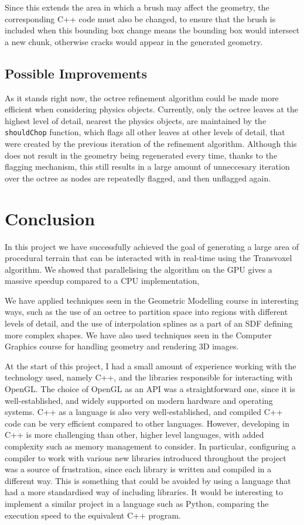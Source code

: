 \documentclass{article}
\begin{document}
Since this extends the area in which a brush may affect the geometry, the corresponding C++ code must also be changed, to ensure that the brush is included when this bounding box change means the bounding box would intersect a new chunk, otherwise cracks would appear in the generated geometry.

\subsection{Possible Improvements}
As it stands right now, the octree refinement algorithm could be made more efficient when considering physics objects. Currently, only the octree leaves at the highest level of detail, nearest the physics objects, are maintained by the \texttt{shouldChop} function, which flags all other leaves at other levels of detail, that were created by the previous iteration of the refinement algorithm. Although this does not result in the geometry being regenerated every time, thanks to the flagging mechanism, this still results in a large amount of unneccesary iteration over the octree as nodes are repeatedly flagged, and then unflagged again.
  
\section{Conclusion}
In this project we have successfully achieved the goal of generating a large area of procedural terrain that can be interacted with in real-time using the Transvoxel algorithm. We showed that parallelising the algorithm on the GPU gives a massive speedup compared to a CPU implementation, 

We have applied techniques seen in the Geometric Modelling course in interesting ways, such as the use of an octree to partition space into regions with different levels of detail, and the use of interpolation splines as a part of an SDF defining more complex shapes. We have also used techniques seen in the Computer Graphics course for handling geometry and rendering 3D images.

At the start of this project, I had a small amount of experience working with the technology used, namely C++, and the libraries responsible for interacting with OpenGL. The choice of OpenGL as an API was a straightforward one, since it is well-established, and widely supported on modern hardware and operating systems. C++ as a language is also very well-established, and compiled C++ code can be very efficient compared to other languages. However, developing in C++ is more challenging than other, higher level languages, with added complexity such as memory management to consider. In particular, configuring a compiler to work with various new libraries introduced throughout the project was a source of frustration, since each library is written and compiled in a different way. This is something that could be avoided by using a language that had a more standardised way of including libraries. It would be interesting to implement a similar project in a language such as Python, comparing the execution speed to the equivalent C++ program.
\end{document}
